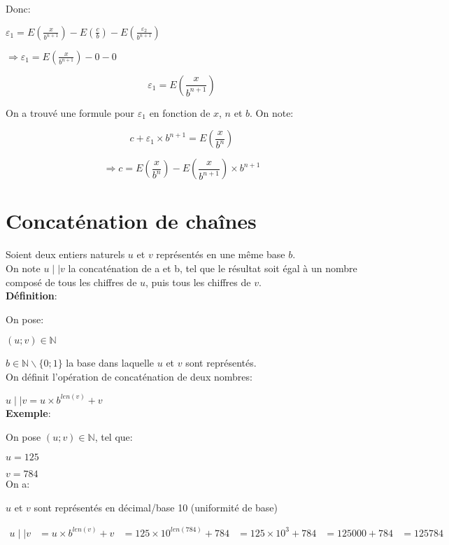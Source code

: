 \documentclass[a4paper, 12pt]{article}
\begin{document}
Donc:

$\varepsilon_{1} =
E \left( \frac{x}{b^{n+1}} \right) -
E \left( \frac{c}{b} \right) - 
E \left( \frac{\varepsilon_{2}}{b^{n+1}} \right)$

$\Rightarrow \varepsilon_{1} = E \left( \frac{x}{b^{n+1}} \right) - 0 - 0$

\[
\varepsilon_{1} = E \left( \frac{x}{b^{n+1}} \right)
\]

\noindent On a trouvé une formule pour $\varepsilon_{1}$ en fonction de $x$, $n$ et $b$. On note:

\[
c + \varepsilon_{1} \times b^{n+1} = E \left( \frac{x}{b^{n}} \right)
\]

\[
\Rightarrow c = E \left( \frac{x}{b^{n}} \right) - E \left( \frac{x}{b^{n+1}} \right) \times b^{n+1}
\]

\newpage

\section*{Concaténation de chaînes}
Soient deux entiers naturels $u$ et $v$ représentés en une même base $b$. \\
On note $u \mid\mid v$ la concaténation de a et b, tel que le résultat soit égal
à un nombre composé de tous les chiffres de $u$, puis tous les chiffres de $v$. \\

\noindent \textbf{Définition}:

On pose:

$\left( u; v \right) \in \mathbb{N}$

$b \in \mathbb{N} \backslash \{0; 1\}$ la base dans laquelle $u$ et $v$ sont représentés. \\

On définit l'opération de concaténation de deux nombres:

$u \mid\mid v = u \times b^{len \left( v \right)} + v$ \\

\noindent \textbf{Exemple}:

On pose $\left( u; v \right) \in \mathbb{N}$, tel que:

$u = 125$

$v = 784$ \\

On a:

$u$ et $v$ sont représentés en décimal/base 10 (uniformité de base)

\begin{align*}
	u \mid\mid v
	
	&= u \times b^{len \left( v \right)} + v
	
	&= 125 \times 10^{len \left( 784 \right)} + 784
	
	&= 125 \times 10^{3} + 784
	
	&= 125000 + 784
	
	&= 125784
\end{align*} \\
\end{document}
